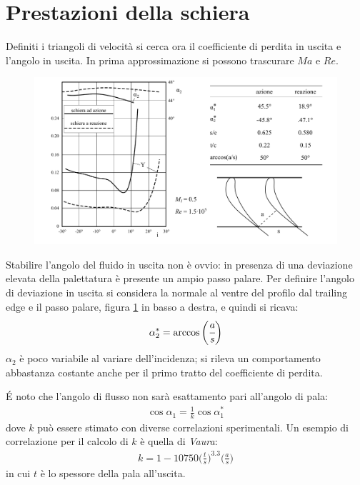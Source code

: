 \section{Prestazioni della schiera}
Definiti i triangoli di velocità si cerca ora il coefficiente di perdita in uscita e l'angolo in uscita. In prima approssimazione si possono trascurare $Ma$ e $Re$.
\begin{figure}
\centering
  \includegraphics[width=\textwidth]{fig/PrestSchieraTurb.pdf}
\caption{}
\label{fig:PrestSchieraTurb}
\end{figure}

Stabilire l'angolo del fluido in uscita non è ovvio: in presenza di una deviazione elevata della palettatura è presente un ampio passo palare. Per definire l'angolo di deviazione in uscita si considera la normale al ventre del profilo dal trailing edge e il passo palare, figura \ref{fig:PrestSchieraTurb} in basso a destra, e quindi si ricava:
\begin{align*}
\alpha_2^* = \arccos \bigg(\cfrac{a}{s}\bigg)
\end{align*}
$\alpha_2$ è poco variabile al variare dell'incidenza; si rileva un comportamento abbastanza costante anche per il primo tratto del coefficiente di perdita.

\'E noto che l'angolo di flusso non sarà esattamento pari all'angolo di pala:
\begin{align*}
\cos \alpha_1 = \frac{1}{k} \cos \alpha_1^*
\end{align*}
dove $k$ può essere stimato con diverse correlazioni sperimentali. Un esempio di correlazione per il calcolo di $k$ è quella di \textit{Vaura}:
\begin{align*}
k = 1 - 10750 \bigg( \frac{t}{s} \bigg)^{3.3} \bigg( \frac{a}{s} \bigg)
\end{align*}
in cui $t$ è lo spessore della pala all'uscita.

